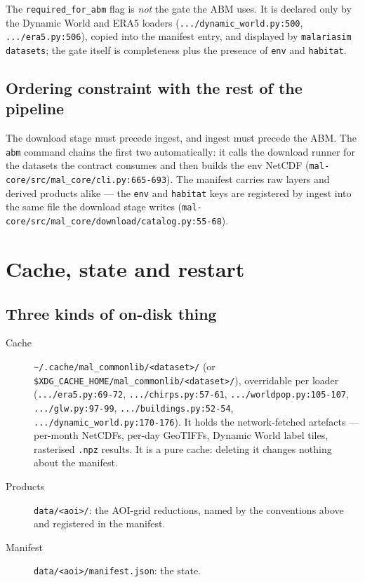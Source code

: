 \documentclass[11pt,a4paper]{article}
\newcommand{\code}[1]{\texttt{#1}}
\begin{document}
The \code{required\_for\_abm} flag is \emph{not} the gate the ABM uses. It is
declared only by the Dynamic World and ERA5 loaders
(\code{.../dynamic\_world.py:500}, \code{.../era5.py:506}), copied into the
manifest entry, and displayed by \code{malariasim datasets}; the gate itself
is completeness plus the presence of \code{env} and \code{habitat}.

\subsection{Ordering constraint with the rest of the pipeline}

The download stage must precede ingest, and ingest must precede the ABM. The
\code{abm} command chains the first two automatically: it calls the download
runner for the datasets the contract consumes and then builds the env NetCDF
(\code{mal-core/src/mal\_core/cli.py:665-693}). The manifest carries raw
layers and derived products alike --- the \code{env} and \code{habitat} keys
are registered by ingest into the same file the download stage writes
(\code{mal-core/src/mal\_core/download/catalog.py:55-68}).

\section{Cache, state and restart}
\label{sec:state}

\subsection{Three kinds of on-disk thing}

\begin{description}
\item[Cache] \code{\textasciitilde/.cache/mal\_commonlib/<dataset>/} (or
\code{\$XDG\_CACHE\_HOME/mal\_commonlib/<dataset>/}), overridable per loader
(\code{.../era5.py:69-72}, \code{.../chirps.py:57-61},
\code{.../worldpop.py:105-107}, \code{.../glw.py:97-99},
\code{.../buildings.py:52-54}, \code{.../dynamic\_world.py:170-176}). It
holds the network-fetched artefacts --- per-month NetCDFs, per-day GeoTIFFs,
Dynamic World label tiles, rasterised \code{.npz} results. It is a pure
cache: deleting it changes nothing about the manifest.
\item[Products] \code{data/<aoi>/}: the AOI-grid reductions, named by the
conventions above and registered in the manifest.
\item[Manifest] \code{data/<aoi>/manifest.json}: the state.
\end{description}
\end{document}
